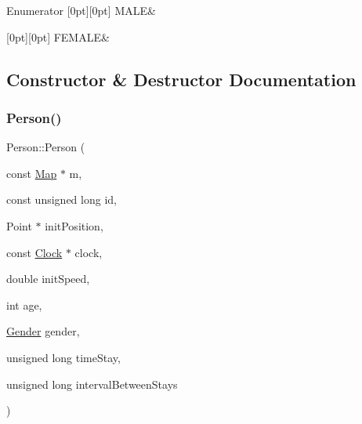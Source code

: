 \begin{DoxyEnumFields}{Enumerator}
[0pt][0pt]{}\mbox{\label{class_person_aff84ca16bd4dbf364614d86f20b29dd2a16691f7cc6595f87b71d9b43ad23fcb4}} 
M\+A\+LE&\\
\hline

[0pt][0pt]{}\mbox{\label{class_person_aff84ca16bd4dbf364614d86f20b29dd2a8ee21010fb2d8e8794ef72be368da064}} 
F\+E\+M\+A\+LE&\\
\hline

\end{DoxyEnumFields}


\subsection{Constructor \& Destructor Documentation}
\mbox{\label{class_person_a1fb64d7ef7c528d01dd09b2099b00e38}} 
\subsubsection{\texorpdfstring{Person()}{Person()}}
{\footnotesize\ttfamily Person\+::\+Person (\begin{DoxyParamCaption}\item[{const \mbox{\hyperlink{class_map}{Map}} $\ast$}]{m,  }\item[{const unsigned long}]{id,  }\item[{Point $\ast$}]{init\+Position,  }\item[{const \mbox{\hyperlink{class_clock}{Clock}} $\ast$}]{clock,  }\item[{double}]{init\+Speed,  }\item[{int}]{age,  }\item[{\mbox{\hyperlink{class_person_aff84ca16bd4dbf364614d86f20b29dd2}{Gender}}}]{gender,  }\item[{unsigned long}]{time\+Stay,  }\item[{unsigned long}]{interval\+Between\+Stays }\end{DoxyParamCaption})\hspace{0.3cm}{\ttfamily [explicit]}}

